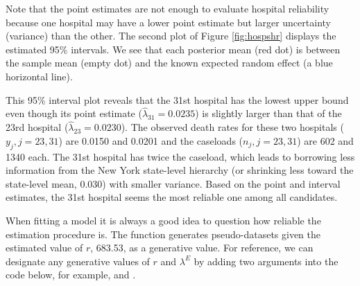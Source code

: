 \documentclass[article]{jss}
\begin{document}
Note that the point estimates are not enough to evaluate hospital reliability because one hospital may have a lower point estimate but  larger uncertainty (variance) than the other. The second plot of Figure \ref{fig:hospshr} displays the estimated 95\% intervals. We see that each posterior mean (red dot) is between the sample mean (empty dot) and the known expected random effect (a blue horizontal line). %

This 95\% interval plot reveals that the 31st hospital has the lowest upper bound even though its point estimate ($\hat{\lambda}_{31}=0.0235$) is slightly larger than that of the 23rd hospital ($\hat{\lambda}_{23}=0.0230$). The observed death rates for these two hospitals ($y_{j}, j=23, 31$) are 0.0150 and 0.0201 and the caseloads ($n_{j}, j =23, 31$) are 602 and 1340 each. The 31st hospital has twice the caseload, which leads to borrowing less information from the New York state-level hierarchy (or shrinking less toward the state-level mean, 0.030) with smaller variance. Based on the point and interval estimates, the 31st hospital seems the most reliable one among all candidates. 


When fitting a model it is always a good idea to question how reliable the estimation procedure is. The function   generates pseudo-datasets given the estimated value of $r$, 683.53, as a generative value. For reference, we can designate any generative values of $r$ and $\lambda^E$ by adding two arguments into the code below, for example,  and .

\end{document}
